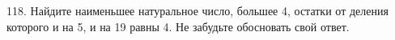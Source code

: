 118. Найдите наименьшее натуральное число, большее 4, остатки от деления которого и на 5, и на 19 равны 4. Не забудьте обосновать свой ответ.\\
